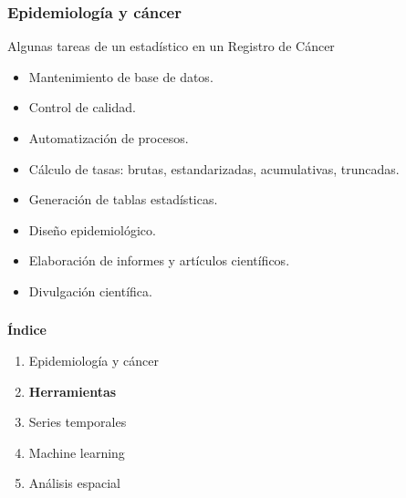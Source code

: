 \documentclass{beamer}
\begin{document}
\begin{frame}\frametitle{Epidemiología y cáncer}
	
	\begin{block}{Algunas tareas de un estadístico en un Registro de Cáncer}
		\begin{itemize}
			\item Mantenimiento de base de datos.
			\item Control de calidad.
			\item Automatización de procesos.
			\item Cálculo de tasas: brutas, estandarizadas, acumulativas, truncadas.
			\item Generación de tablas estadísticas.
			\item Diseño epidemiológico.
			\item Elaboración de informes y artículos científicos.
			\item Divulgación científica.
		\end{itemize}
	\end{block}	
\end{frame}


\begin{frame}\frametitle{}
	
	\Large{\textbf{Índice}}\\[2ex]
	\normalsize
	\begin{enumerate}
		\item Epidemiología y cáncer\\[2ex]
		\item \textbf{Herramientas}\\[2ex]
		\item Series temporales \\[2ex]
		\item Machine learning  \\[2ex]
		\item Análisis espacial \\[2ex]
	\end{enumerate}
	
\end{frame}
\end{document}
